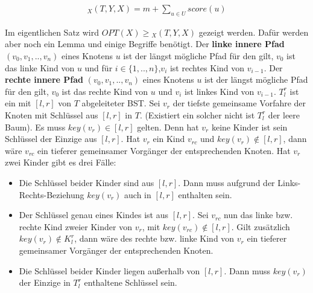 \documentclass[a4paper,12pt]{article}
\begin{document}
\begin{align*}
_X(T, Y, X)  = m + \sum_{u \in U} {\mathit{score}} \left(u\right)
\end{align*} %

\noindent Im eigentlichen Satz wird $\mathit{OPT}\left(X\right) \geq {_X(T, Y, X)} $ gezeigt werden. Dafür werden aber noch ein Lemma und einige Begriffe benötigt. Der \textbf{linke innere Pfad} $\left(v_0,v_1,..,v_n \right)$ eines Knotens $u$ ist der längst mögliche Pfad für den gilt, $v_0$ ist das linke Kind von $u$ und für $i \in \{1,..,n\}$,$v_i$ ist rechtes Kind von $v_{i-1}$. Der \textbf{rechte innere Pfad} $\left(v_0,v_1,..,v_n \right)$ eines Knotens $u$ ist der längst mögliche Pfad für den gilt, $v_0$ ist das rechte Kind von $u$ und $v_i$ ist linkes Kind von $v_{i-1}$. $T^r_l$ ist ein mit $\left[l,r\right]$ von $T$ abgeleiteter BST. Sei $v_r$ der tiefste gemeinsame Vorfahre der Knoten mit Schlüssel aus  $\left[l,r\right]$ in $T$. (Existiert ein solcher nicht ist $T^r_l$ der leere Baum). Es muss $\mathit{key}(v_r) \in \left[l,r\right]$ gelten. Denn hat $v_r$ keine Kinder ist sein Schlüssel der Einzige aus $\left[l,r\right]$. Hat $v_r$ ein Kind $v_{rc}$ und $\mathit{key}(v_r) \notin \left[l,r\right]$, dann wäre $v_{rc}$ ein tieferer gemeinsamer Vorgänger der entsprechenden Knoten. Hat $v_r$ zwei Kinder gibt es drei Fälle:
\begin{itemize}
	\item Die Schlüssel beider Kinder sind aus $\left[l,r\right]$. Dann muss aufgrund der Links-Rechts-Beziehung  $\mathit{key}(v_r)$ auch in $\left[l,r\right]$ enthalten sein.
	\item Der Schlüssel genau eines Kindes ist aus $\left[l,r\right]$. Sei $v_{rc}$ nun das linke bzw. rechte Kind zweier  Kinder von $v_r$, mit $\mathit{key}(v_{rc}) \notin \left[l,r\right]$.  Gilt zusätzlich $\mathit{key}(v_r) \notin K^r_l$, dann wäre des rechte bzw. linke Kind von $v_r$ ein tieferer gemeinsamer Vorgänger der entsprechenden Knoten.
	\item Die Schlüssel beider Kinder liegen außerhalb von $\left[l,r\right]$.  Dann muss $\mathit{key}(v_r)$ der Einzige in $T^r_l$ enthaltene Schlüssel sein.
\end{itemize}
\end{document}
